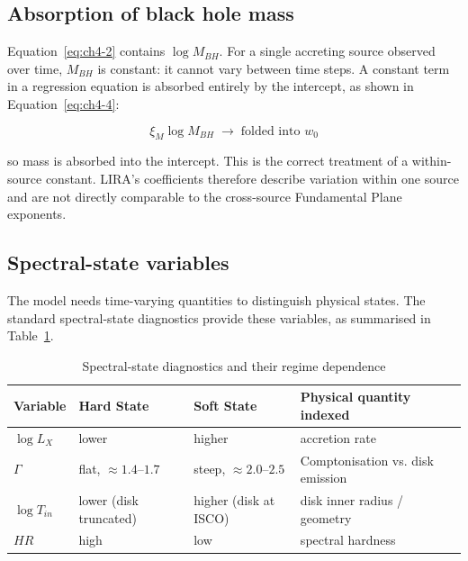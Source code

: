 \subsection{Absorption of black hole mass}

Equation~\eqref{eq:ch4-2} contains $\log M_{BH}$. For a single accreting source observed over
time, $M_{BH}$ is constant: it cannot vary between time steps. A constant term in a
regression equation is absorbed entirely by the intercept, as shown in Equation~\eqref{eq:ch4-4}:

\begin{equation}
    \label{eq:ch4-4}
\xi_M \log M_{BH} \;\longrightarrow\; \text{folded into } w_0
\end{equation}

so mass is absorbed into the intercept. This is the correct treatment of a
within-source constant. LIRA's coefficients therefore describe variation within one
source and are not directly comparable to the cross-source Fundamental Plane
exponents.


\subsection{Spectral-state variables}

The model needs time-varying quantities to distinguish physical states. The standard
spectral-state diagnostics provide these variables, as summarised in
Table~\ref{tab:ch4-states}.



\begin{table}[htbp]
    \centering
    \small
    \caption{Spectral-state diagnostics and their regime dependence}
    \label{tab:ch4-states}
    \begin{tabularx}{\textwidth}{|>{\raggedright\arraybackslash}p{1.8cm}|>{\raggedright\arraybackslash}p{2.5cm}|>{\raggedright\arraybackslash}p{2.5cm}|>{\raggedright\arraybackslash}X|}
        \hline
        Variable & Hard State & Soft State & Physical quantity indexed \\ \hline
        $\log L_X$ & lower & higher & accretion rate \\ \hline
        $\Gamma$ & flat, $\approx1.4$--$1.7$ & steep, $\approx2.0$--$2.5$ & Comptonisation vs. disk emission \\ \hline
        $\log T_{in}$ & lower (disk truncated) & higher (disk at ISCO) & disk inner radius / geometry \\ \hline
        $HR$ & high & low & spectral hardness \\ \hline
\end{tabularx}
\end{table}


